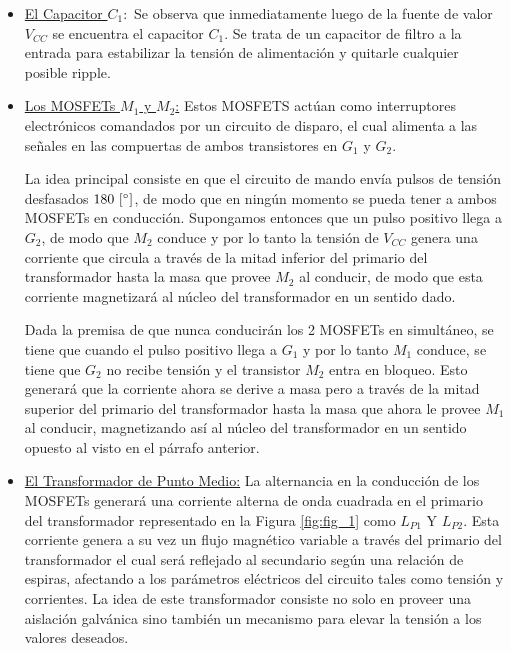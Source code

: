 \documentclass[12pt,a4paper]{article}
\begin{document}
\begin{itemize}
    \item \underline{El Capacitor $C_{1}:$} Se observa que inmediatamente luego de la fuente de valor $V_{CC}$ se encuentra el capacitor $C_{1}$. Se trata de un capacitor de filtro a la entrada para estabilizar la tensión de alimentación y quitarle cualquier posible ripple.
    
    \item \underline{Los MOSFETs $M_{1}$ y $M_{2}$:} Estos MOSFETS actúan como interruptores electrónicos comandados por un circuito de disparo, el cual alimenta a las señales en las compuertas de ambos transistores en $G_{1}$ y $G_{2}$.
    
    La idea principal consiste en que el circuito de mando envía pulsos de tensión desfasados $180 \ [\degree]$, de modo que en ningún momento se pueda tener a ambos MOSFETs en conducción. Supongamos entonces que un pulso positivo llega a $G_{2}$, de modo que $M_{2}$ conduce y por lo tanto la tensión de $V_{CC}$ genera una corriente que circula a través de la mitad inferior del primario del transformador hasta la masa que provee $M_{2}$ al conducir, de modo que esta corriente magnetizará al núcleo del transformador en un sentido dado.
    
    Dada la premisa de que nunca conducirán los 2 MOSFETs en simultáneo, se tiene que cuando el pulso positivo llega a $G_{1}$ y por lo tanto $M_{1}$ conduce, se tiene que $G_{2}$ no recibe tensión y el transistor $M_{2}$ entra en bloqueo. Esto generará que la corriente ahora se derive a masa pero a través de la mitad superior del primario del transformador hasta la masa que ahora le provee $M_{1}$ al conducir, magnetizando así al núcleo del transformador en un sentido opuesto al visto en el párrafo anterior.

    \item \underline{El Transformador de Punto Medio:} La alternancia en la conducción de los MOSFETs generará una corriente alterna de onda cuadrada en el primario del transformador representado en la Figura \ref{fig:fig_1} como $L_{P1}$ Y $L_{P2}$. Esta corriente genera a su vez un flujo magnético variable a través del primario del transformador el cual será reflejado al secundario según una relación de espiras, afectando a los parámetros eléctricos del circuito tales como tensión y corrientes. La idea de este transformador consiste no solo en proveer una aislación galvánica sino también un mecanismo para elevar la tensión a los valores deseados.


\end{itemize}
\end{document}

